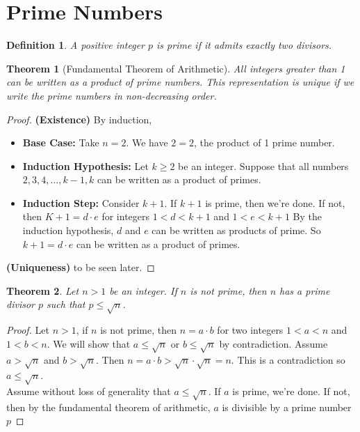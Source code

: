 \documentclass[openany]{report}
\newtheorem{theorem}{Theorem}[section]
\newtheorem{definition}{Definition}[section]
\begin{document}
\section{Prime Numbers}
\begin{definition}\label{definition5.1.1}
    A positive integer $p$ is prime if it admits exactly two divisors.
\end{definition}
\begin{theorem}[Fundamental Theorem of Arithmetic]\label{theorem5.1.1}
    All integers greater than 1 can be written as a product of prime numbers. This representation is unique if we write the prime numbers in non-decreasing order.
\end{theorem}
\begin{proof}
\textbf{(Existence)} By induction,
    \begin{itemize}
        \item \textbf{Base Case:} Take $n = 2$. We have $2 = 2$, the product of 1 prime number. 
        \item \textbf{Induction Hypothesis:} Let $k \geq 2$ be an integer. Suppose that all numbers $2,3,4, \ldots, k-1, k$ can be written as a product of primes.
        \item \textbf{Induction Step:} Consider $k +1$. If $k+1$ is prime, then we're done. If not, then $K+1 = d\cdot e$ for integers $1 < d < k+1$ and $1 < e < k+1$
        By the induction hypothesis, $d$ and $e$ can be written as products of prime. So $k + 1 = d \cdot e$ can be written as a product of primes. 
    \end{itemize}
\textbf{(Uniqueness)} to be seen later.
\end{proof}
\begin{theorem}\label{theorem5.1.2}
    Let $n > 1$ be an integer. If $n$ is not prime, then $n$ has a prime divisor $p$ such that $p \leq \sqrt{n}$.
\end{theorem}
\begin{proof}
    Let $n > 1$, if $n$ is not prime, then $n = a \cdot b$ for two integers $1 < a < n$ and $1 < b < n$. We will show that $a \leq \sqrt{n}$ or $b \leq \sqrt{n}$ by contradiction. Assume $a > \sqrt{n}$ and $b > \sqrt{n}$. Then $n = a \cdot b > \sqrt{n} \cdot \sqrt{n} = n$. This is a contradiction so $a \leq \sqrt{n}$. \\[1ex] 
    Assume without loss of generality that $a \leq \sqrt{n}$. If $a$ is prime, we're done. If not, then by the fundamental theorem of arithmetic, $a$ is divisible by a prime number $p$
\end{proof}
\end{document}
